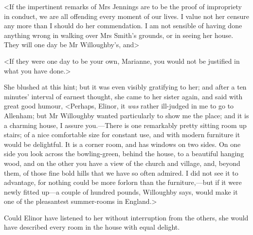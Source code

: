 <If the impertinent remarks of Mrs Jennings are to be the proof of impropriety in conduct, we are all offending every moment of our lives. I value not her censure any more than I should do her commendation. I am not sensible of having done anything wrong in walking over Mrs Smith's grounds, or in seeing her house. They will one day be Mr Willoughby's, and\longdash>

<If they were one day to be your own, Marianne, you would not be justified in what you have done.>

She blushed at this hint; but it was even visibly gratifying to her; and after a ten minutes' interval of earnest thought, she came to her sister again, and said with great good humour, <Perhaps, Elinor, it \textit{was} rather ill-judged in me to go to Allenham; but Mr Willoughby wanted particularly to show me the place; and it is a charming house, I assure you.—There is one remarkably pretty sitting room up stairs; of a nice comfortable size for constant use, and with modern furniture it would be delightful. It is a corner room, and has windows on two sides. On one side you look across the bowling-green, behind the house, to a beautiful hanging wood, and on the other you have a view of the church and village, and, beyond them, of those fine bold hills that we have so often admired. I did not see it to advantage, for nothing could be more forlorn than the furniture,—but if it were newly fitted up—a couple of hundred pounds, Willoughby says, would make it one of the pleasantest summer-rooms in England.>

Could Elinor have listened to her without interruption from the others, she would have described every room in the house with equal delight.